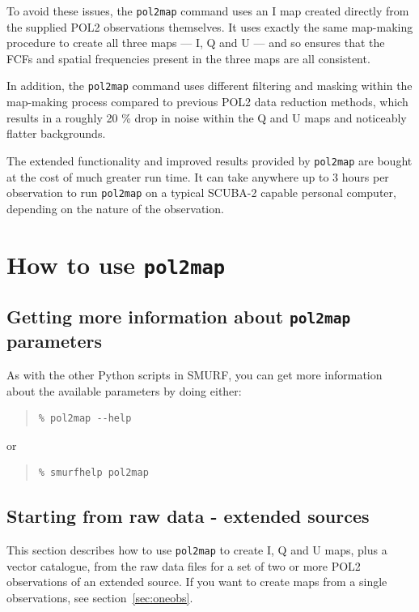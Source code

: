 \documentclass[twoside,11pt]{starlink}
\begin{document}
To avoid these issues, the \texttt{pol2map} command uses an I map created
directly from the supplied POL2 observations themselves. It uses exactly
the same map-making procedure to create all three maps --- I, Q and U --- and
so ensures that the FCFs and spatial frequencies present in the three maps are
all consistent.

In addition, the \texttt{pol2map} command uses different filtering and
masking within the map-making process compared to previous POL2 data reduction
methods, which results in a roughly 20 \% drop in noise within the Q and U
maps and noticeably flatter backgrounds.

The extended functionality and improved results provided by
\texttt{pol2map} are bought at the cost of much greater run time. It can
take anywhere up to 3 hours per observation to run \texttt{pol2map} on a
typical SCUBA-2 capable personal computer, depending on the nature of the
observation.

\section{How to use \texttt{pol2map}}

\subsection{Getting more information about \texttt{pol2map} parameters}
As with the other Python scripts in SMURF, you can get more information
about the available parameters by doing either:

\begin{quote}
\begin{verbatim}
% pol2map --help
\end{verbatim}
\end{quote}

or

\begin{quote}
\begin{verbatim}
% smurfhelp pol2map
\end{verbatim}
\end{quote}



\subsection{Starting from raw data - extended sources\label{se1}}
This section describes how to use \texttt{pol2map} to create I, Q and U
maps, plus a vector catalogue, from the raw data files for a set of two
or more POL2 observations of an extended source. If you want to create
maps from a single observations, see section~\ref{sec:oneobs}.
\end{document}
